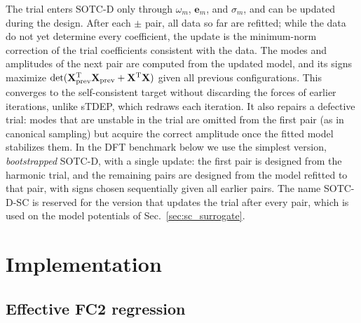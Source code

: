 \documentclass[aip,jap,reprint,amsmath,amssymb,floatfix]{revtex4-2}
\begin{document}
The trial enters SOTC-D only
through $\omega_m$, $\mathbf e_m$, and $\sigma_m$, and can be updated during
the design. After each $\pm$ pair, all data so far are refitted; while the
data do not yet determine every coefficient, the update is the minimum-norm
correction of the trial coefficients consistent with the data. The modes and
amplitudes of the next pair are computed from the updated model, and its signs
maximize $\det(\mathbf X_{\rm prev}^{\rm T}\mathbf X_{\rm prev}
+\mathbf X^{\rm T}\mathbf X)$ given all previous configurations. This
converges to the self-consistent target without discarding the forces of
earlier iterations, unlike sTDEP, which redraws each iteration. It also
repairs a defective trial: modes that are unstable in the trial are omitted
from the first pair (as in canonical sampling) but acquire the correct
amplitude once the fitted model stabilizes them. In the DFT benchmark below we
use the simplest version, \emph{bootstrapped} SOTC-D, with a single update:
the first pair is designed from the harmonic trial, and the remaining pairs
are designed from the model refitted to that pair, with signs chosen
sequentially given all earlier pairs. The name SOTC-D-SC is reserved for the
version that updates the trial after every pair, which is used on the model
potentials of Sec.~\ref{sec:sc_surrogate}.

\section{Implementation}\label{sec:impl}

\subsection{Effective FC2 regression}\label{sec:fit}
\end{document}
